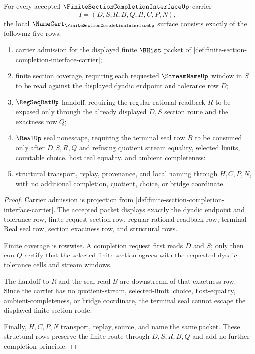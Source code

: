 \begin{theorem}
\label{thm:finite-section-completion-interface-namecert-obligations}
For every accepted $\FiniteSectionCompletionInterfaceUp$ carrier
$$
I=(D,S,R,B,Q,H,C,P,N),
$$
the local $\NameCert_{\FiniteSectionCompletionInterfaceUp}$ surface consists exactly of the following five rows:
\begin{enumerate}
\item carrier admission for the displayed finite $\BHist$ packet of \autoref{def:finite-section-completion-interface-carrier};
\item finite section coverage, requiring each requested $\StreamNameUp$ window in $S$ to be read against the displayed dyadic endpoint and tolerance row $D$;
\item $\RegSeqRatUp$ handoff, requiring the regular rational readback $R$ to be exposed only through the already displayed $D,S$ section route and the exactness row $Q$;
\item $\RealUp$ seal nonescape, requiring the terminal seal row $B$ to be consumed only after $D,S,R,Q$ and refusing quotient stream equality, selected limits, countable choice, host real equality, and ambient completeness;
\item structural transport, replay, provenance, and local naming through $H,C,P,N$, with no additional completion, quotient, choice, or bridge coordinate.
\end{enumerate}
\end{theorem}
\begin{proof}
Carrier admission is projection from \autoref{def:finite-section-completion-interface-carrier}. The accepted packet displays exactly the dyadic endpoint and tolerance row, finite request-section row, regular rational readback row, terminal Real seal row, section exactness row, and structural rows.

Finite coverage is rowwise. A completion request first reads $D$ and $S$; only then can $Q$ certify that the selected finite section agrees with the requested dyadic tolerance cells and stream windows.

The handoff to $R$ and the seal read $B$ are downstream of that exactness row. Since the carrier has no quotient-stream, selected-limit, choice, host-equality, ambient-completeness, or bridge coordinate, the terminal seal cannot escape the displayed finite section route.

Finally, $H,C,P,N$ transport, replay, source, and name the same packet. These structural rows preserve the finite route through $D,S,R,B,Q$ and add no further completion principle.
\end{proof}

